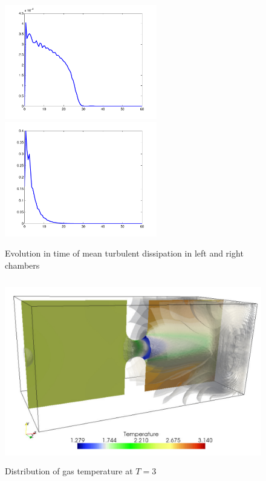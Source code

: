 \begin{figure}[bhpt]
\centerline{
\includegraphics[height=5.0cm]
{chapters/hoffman-3/pdf/tur_disp_l.pdf}
\includegraphics[height=5.0cm]
{chapters/hoffman-3/pdf/tur_disp_r.pdf}
}
\caption{Evolution in time of mean turbulent dissipation in left and right
chambers}
\label{tur_disipation}
\end{figure}



\begin{figure}[bhpt]
\centerline{
\includegraphics[height=8.0cm]
{chapters/hoffman-3/pdf/Tem_T_3.pdf}
}
\caption{Distribution of gas temperature at $T=3$}
\label{temp3}
\end{figure}



